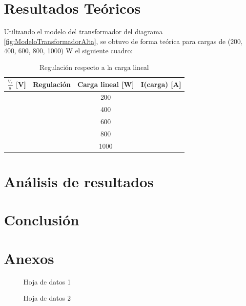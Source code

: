 \documentclass[11pt,letterpaper]{article}     %
\begin{document}
\section{Resultados Teóricos}
Utilizando el modelo del transformador del diagrama \ref{fig:ModeloTransformadorAlta}, se obtuvo de forma teórica para cargas de (200, 400, 600, 800, 1000) W el siguiente cuadro:
\begin{table}[H]
\centering
\caption{Regulación respecto a la carga lineal}
\label{RegcuadroTEORICO}
\begin{tabular}{|c|c|c|c|}
\hline
\textbf{$\frac{V_{p}}{a}$ {[}V{]}} & \textbf{Regulación} & \textbf{Carga lineal {[}W{]}}  & \textbf{I(carga) {[}A{]}} \\ \hline
                                   &                     & 200    &             \\ \hline
                                   &                     & 400    &             \\ \hline
                                   &                     & 600      &              \\ \hline
                                   &                     & 800    &                \\ \hline
                                   &                     & 1000   &                \\ \hline
\end{tabular}
\end{table}
\section{Análisis de resultados}
\section{Conclusión}
\newpage
\section{Anexos}
\begin{figure}[H]
    \centering
    \caption{Hoja de datos 1}
\end{figure}
\begin{figure}[H]
    \centering
    \caption{Hoja de datos 2}
\end{figure}
\end{document}
